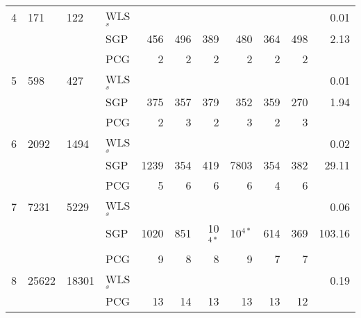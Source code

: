 \documentclass[11pt]{article}
\newcommand{\0}{\phantom{0}}
\begin{document}
\begin{table}[ht]
\begin{threeparttable}
\begin{tabular}{llllrrrrrrr}
			\midrule
			4   & 171    & 122    & WLS$_{s}$ &                                            &     &           &           &     &     & 0.01           \\
			    &        &        & SGP       & 456                                        & 496 & 389       & 480       & 364 & 498 & 2.13           \\
			    &        &        & PCG       & 2                                          & 2   & 2         & 2         & 2   & 2   & \bm{$0.29$}    \\
			\midrule
			5   & 598    & 427    & WLS$_{s}$ &                                            &     &           &           &     &     & 0.01           \\
			    &        &        & SGP       & 375                                        & 357 & 379       & 352       & 359 & 270 & 1.94           \\
			    &        &        & PCG       & 2                                          & 3   & 2         & 3         & 2   & 3   & \bm{$0.33$}    \\
			\midrule
			6   & 2092   & 1494   & WLS$_{s}$ &                                            &     &           &           &     &     & 0.02           \\
			    &        &        & SGP       & 1239                                       & 354 & 419       & 7803      & 354 & 382 & 29.11          \\
			    &        &        & PCG       & 5                                          & 6   & 6         & 6         & 4   & 6   & \bm{$0.51$}    \\
			\midrule
			7   & 7231   & 5229   & WLS$_{s}$ &                                            &     &           &           &     &     & 0.06           \\
			    &        &        & SGP       & 1020                                       & 851 & 10$^{4*}$ & 10$^{4*}$ & 614 & 369 & 103.16         \\
			    &        &        & PCG       & 9                                          & 8   & 8         & 9         & 7   & 7   & \bm{$2.09$}    \\
			\midrule
			8   & 25622  & 18301  & WLS$_{s}$ &                                            &     &           &           &     &     & 0.19           \\
			    &        &        & PCG       & 13                                         & 14  & 13        & 13        & 13  & 12  & \bm{$19.08$}   \\

\end{tabular}
\end{threeparttable}
\end{table}
\end{document}
